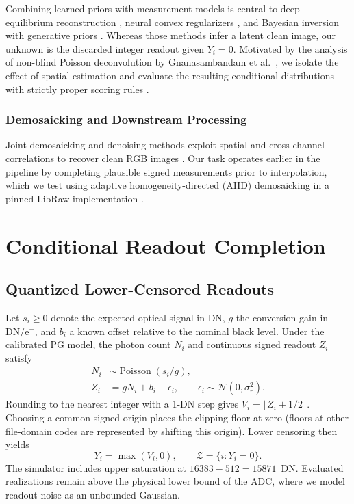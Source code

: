 \documentclass[10pt,twocolumn,journal]{IEEEtran}
\begin{document}
Combining learned priors with measurement models is central to deep equilibrium reconstruction \cite{gilton2021}, neural convex regularizers \cite{goujon2023}, and Bayesian inversion with generative priors \cite{bohra2022}. Whereas those methods infer a latent clean image, our unknown is the discarded integer readout given $Y_i=0$. Motivated by the analysis of non-blind Poisson deconvolution by Gnanasambandam et al.\ \cite{gnanasambandam2024}, we isolate the effect of spatial estimation and evaluate the resulting conditional distributions with strictly proper scoring rules \cite{gneiting2007}.

\subsubsection{Demosaicking and Downstream Processing}
Joint demosaicking and denoising methods exploit spatial and cross-channel correlations to recover clean RGB images \cite{gharbi2016}. Our task operates earlier in the pipeline by completing plausible signed measurements prior to interpolation, which we test using adaptive homogeneity-directed (AHD) demosaicking \cite{hirakawa2005} in a pinned LibRaw implementation \cite{libraw}.

\section{Conditional Readout Completion}
\subsection{Quantized Lower-Censored Readouts}
Let $s_i\geq0$ denote the expected optical signal in DN, $g$ the conversion gain in DN/e$^{-}$, and $b_i$ a known offset relative to the nominal black level. Under the calibrated PG model, the photon count $N_i$ and continuous signed readout $Z_i$ satisfy
\begin{align}
N_i&\sim\operatorname{Poisson}(s_i/g),\label{eq:pois}\\
Z_i&=gN_i+b_i+\epsilon_i,\qquad \epsilon_i\sim\mathcal N(0,\sigma_r^2).\label{eq:forward}
\end{align}
Rounding to the nearest integer with a 1-DN step gives $V_i=\lfloor Z_i+1/2\rfloor$. Choosing a common signed origin places the clipping floor at zero (floors at other file-domain codes are represented by shifting this origin). Lower censoring then yields
\begin{equation}
Y_i=\max(V_i,0),\qquad \mathcal Z=\{i:Y_i=0\}.\label{eq:censor}
\end{equation}
The simulator includes upper saturation at $16383-512=15871$~DN. Evaluated realizations remain above the physical lower bound of the ADC, where we model readout noise as an unbounded Gaussian.
\end{document}
